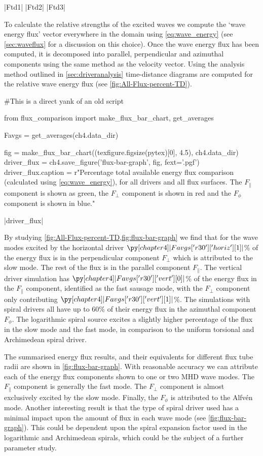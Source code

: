 \py[chapter4]|Ftd1|
\py[chapter4]|Ftd2|
\py[chapter4]|Ftd3|

To calculate the relative strengths of the excited waves we compute the `wave energy flux' vector everywhere in the domain using \cref{eq:wave_energy} (see \cref{sec:waveflux} for a discussion on this choice).
Once the wave energy flux has been computed, it is decomposed into parallel, perpendicular and azimuthal components using the same method as the velocity vector. 
Using the analysis method outlined in \cref{sec:driveranalysis} time-distance diagrams are computed for the relative wave energy flux (see \cref{fig:All-Flux-percent-TD}). 


\begin{pycode}[chapter4]
#This is a direct yank of an old script

from flux_comparison import make_flux_bar_chart, get_averages

Favgs = get_averages(ch4.data_dir)

fig = make_flux_bar_chart((texfigure.figsize(pytex)[0], 4.5), ch4.data_dir)
driver_flux = ch4.save_figure('flux-bar-graph', fig, fext='.pgf')
driver_flux.caption = r"Percentage total available energy flux comparison (calculated using \cref{eq:wave_energy}), for all drivers and all flux surfaces. The $F_\parallel$ component is shown as green, the $F_\perp$ component is shown in red and the $F_\phi$ component is shown in blue."
\end{pycode}

\py[chapter4]|driver_flux|


By studying \cref{fig:All-Flux-percent-TD,fig:flux-bar-graph} we find that for the wave modes excited by the horizontal driver $\py[chapter4]|Favgs['r30']['horiz'][1]|$\% of the energy flux is in the perpendicular component $F_\perp$ which is attributed to the slow mode.
The rest of the flux is in the parallel component $F_\parallel$. 
The vertical driver simulation has $\py[chapter4]|Favgs['r30']['vert'][0]|$\% of the energy flux in the $F_\parallel$ component, identified as the fast sausage mode, with the $F_\perp$ component only contributing $\py[chapter4]|Favgs['r30']['vert'][1]|$\%. 
The simulations with spiral drivers all have up to $60$\% of their energy flux in the azimuthal component $F_\phi$. 
The logarithmic spiral source excites a slightly higher percentage of the flux in the slow mode and the fast mode, in comparison to the uniform torsional and Archimedean spiral driver.

The summarised energy flux results, and their equivalents for different flux tube radii are shown in \cref{fig:flux-bar-graph}.
With reasonable accuracy we can attribute each of the energy flux components shown to one or two MHD wave modes.
The $F_\parallel$ component is generally the fast mode. 
The $F_\perp$ component is almost exclusively excited by the slow mode.
Finally, the $F_\phi$ is attributed to the Alfv\'en mode.
Another interesting result is that the type of spiral driver used has a minimal impact upon the amount of flux in each wave mode (see \cref{fig:flux-bar-graph}).
This could be dependent upon the spiral expansion factor used in the logarithmic and Archimedean spirals, which could be the subject of a further parameter study.

